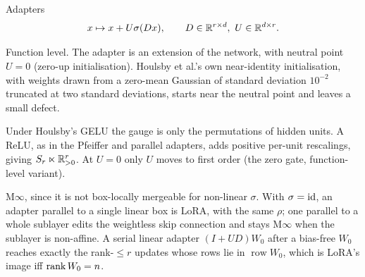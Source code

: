 \begin{example*}{Adapters}\label{ex:adapter}%
\[
  x\mapsto x+U\sigma(Dx),\qquad D\in\mathbb{R}^{r\times d},\ U\in\mathbb{R}^{d\times r}.
\]
\begin{exVIIlines}
\item[Image] Function level. The adapter is an extension of the network, with neutral point $U=0$ (zero-up
  initialisation). Houlsby et al.'s own near-identity initialisation, with weights drawn from a zero-mean Gaussian of
  standard deviation $10^{-2}$ truncated at two standard deviations, starts near the neutral point and leaves a small
  defect.
\item[Fibre] Under Houlsby's GELU the gauge is only the permutations of hidden units. A ReLU, as in the Pfeiffer and
  parallel adapters, adds positive per-unit rescalings, giving $S_r\ltimes\mathbb{R}_{>0}^r$. At $U=0$ only $U$ moves to first
  order (the zero gate, function-level variant).
\item[Merge] M$\infty$, since it is not box-locally mergeable for non-linear $\sigma$. With $\sigma=\mathrm{id}$, an adapter parallel to a
  single linear box is LoRA, with the same $\rho$; one parallel to a whole sublayer edits the weightless skip
  connection and stays M$\infty$ when the sublayer is non-affine. A serial linear adapter $(I+UD)W_0$ after a
  bias-free $W_0$ reaches exactly the rank-$\le r$ updates whose rows lie in $\operatorname{row}W_0$, which is LoRA's
  image iff $\operatorname{rank} W_0=n$.
\end{exVIIlines}
\end{example*}

